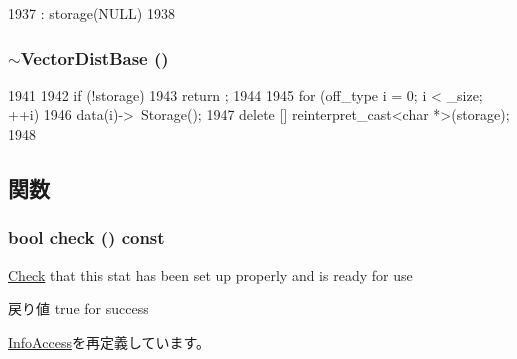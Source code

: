 \begin{DoxyCode}
1937         : storage(NULL)
1938     {}
\end{DoxyCode}
\hypertarget{classStats_1_1VectorDistBase_a5d5ee07108609e85445723915632d161}{
\subsubsection[{$\sim$VectorDistBase}]{\setlength{\rightskip}{0pt plus 5cm}$\sim${\bf VectorDistBase} ()}}
\label{classStats_1_1VectorDistBase_a5d5ee07108609e85445723915632d161}



\begin{DoxyCode}
1941     {
1942         if (!storage)
1943             return ;
1944 
1945         for (off_type i = 0; i < _size; ++i)
1946             data(i)->~Storage();
1947         delete [] reinterpret_cast<char *>(storage);
1948     }
\end{DoxyCode}


\subsection{関数}
\hypertarget{classStats_1_1VectorDistBase_a6ecddb2c44556b7acbc1723a968ff8bb}{
\subsubsection[{check}]{\setlength{\rightskip}{0pt plus 5cm}bool check () const}}
\label{classStats_1_1VectorDistBase_a6ecddb2c44556b7acbc1723a968ff8bb}
\hyperlink{classCheck}{Check} that this stat has been set up properly and is ready for use \begin{DoxyReturn}{戻り値}
true for success 
\end{DoxyReturn}


\hyperlink{classStats_1_1InfoAccess_a6ecddb2c44556b7acbc1723a968ff8bb}{InfoAccess}を再定義しています。


